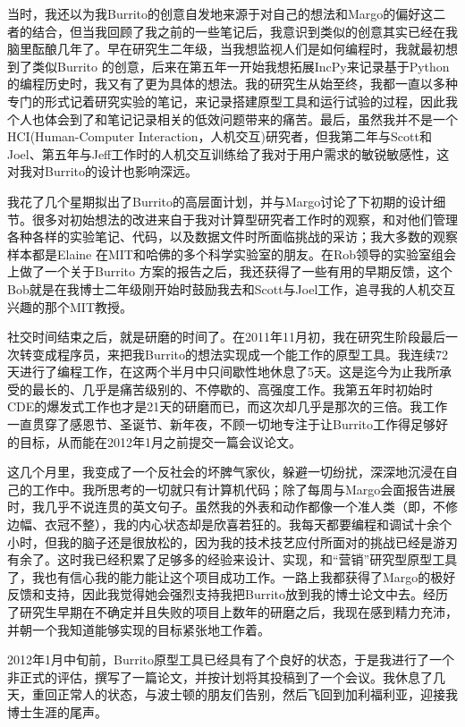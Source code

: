 \documentclass[letter,12pt]{book}
\begin{document}
\begin{CJK}{UTF8}{gbsn}
当时，我还以为我Burrito的创意自发地来源于对自己的想法和Margo的偏好这二者的结合，但当我回顾了我之前的一些笔记后，我意识到类似的创意其实已经在我脑里酝酿几年了。早在研究生二年级，当我想监视人们是如何编程时，我就最初想到了类似Burrito 的创意，后来在第五年一开始我想拓展IncPy来记录基于Python的编程历史时，我又有了更为具体的想法。我的研究生从始至终，我都一直以多种专门的形式记着研究实验的笔记，来记录搭建原型工具和运行试验的过程，因此我个人也体会到了和笔记记录相关的低效问题带来的痛苦。最后，虽然我并不是一个HCI(Human-Computer Interaction，人机交互)研究者，但我第二年与Scott和Joel、第五年与Jeff工作时的人机交互训练给了我对于用户需求的敏锐敏感性，这对我对Burrito的设计也影响深远。

我花了几个星期拟出了Burrito的高层面计划，并与Margo讨论了下初期的设计细节。很多对初始想法的改进来自于我对计算型研究者工作时的观察，和对他们管理各种各样的实验笔记、代码，以及数据文件时所面临挑战的采访；我大多数的观察样本都是Elaine 在MIT和哈佛的多个科学实验室的朋友。在Rob领导的实验室组会上做了一个关于Burrito 方案的报告之后，我还获得了一些有用的早期反馈，这个Bob就是在我博士二年级刚开始时鼓励我去和Scott与Joel工作，追寻我的人机交互兴趣的那个MIT教授。

\breakline

社交时间结束之后，就是研磨的时间了。在2011年11月初，我在研究生阶段最后一次转变成程序员，来把我Burrito的想法实现成一个能工作的原型工具。我连续72天进行了编程工作，在这两个半月中只间歇性地休息了5天。这是迄今为止我所承受的最长的、几乎是痛苦级别的、不停歇的、高强度工作。我第五年时初始时CDE的爆发式工作也才是21天的研磨而已，而这次却几乎是那次的三倍。我工作一直贯穿了感恩节、圣诞节、新年夜，不顾一切地专注于让Burrito工作得足够好的目标，从而能在2012年1月之前提交一篇会议论文。

这几个月里，我变成了一个反社会的坏脾气家伙，躲避一切纷扰，深深地沉浸在自己的工作中。我所思考的一切就只有计算机代码；除了每周与Margo会面报告进展时，我几乎不说连贯的英文句子。虽然我的外表和动作都像一个准人类（即，不修边幅、衣冠不整），我的内心状态却是欣喜若狂的。我每天都要编程和调试十余个小时，但我的脑子还是很放松的，因为我的技术技艺应付所面对的挑战已经是游刃有余了。这时我已经积累了足够多的经验来设计、实现，和“营销”研究型原型工具了，我也有信心我的能力能让这个项目成功工作。一路上我都获得了Margo的极好反馈和支持，因此我觉得她会强烈支持我把Burrito放到我的博士论文中去。经历了研究生早期在不确定并且失败的项目上数年的研磨之后，我现在感到精力充沛，并朝一个我知道能够实现的目标紧张地工作着。

2012年1月中旬前，Burrito原型工具已经具有了个良好的状态，于是我进行了一个非正式的评估，撰写了一篇论文，并按计划将其投稿到了一个会议。我休息了几天，重回正常人的状态，与波士顿的朋友们告别，然后飞回到加利福利亚，迎接我博士生涯的尾声。


\end{CJK}
\end{document}
